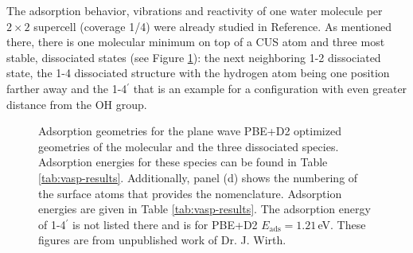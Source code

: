 \documentclass[11pt,DIV=13,BCOR=5mm,a4paper,headinclude]{scrbook}
\begin{document}
The adsorption behavior, vibrations and reactivity of one water  molecule per $2\times 2$ supercell (coverage 1/4) were already studied in Reference\cite{WirthJPCC2012}.
As mentioned there, there is one molecular minimum on top of a CUS atom and three most stable, dissociated states (see Figure \ref{abb:0001_ads}): the next neighboring 1-2 dissociated state, the 1-4 dissociated structure with the hydrogen atom being one position farther away and the 1-4$^\prime$ that is an example for a configuration with even greater distance from the OH group.
\begin{figure} [!ht]
\centering
{}
         \quad
{}
 \quad
{}
 \quad
{}
\caption{Adsorption geometries for the plane wave PBE+D2 optimized geometries of the molecular and the three dissociated species.
Adsorption energies for these species can be found in Table \ref{tab:vasp-results}.
Additionally, panel (d) shows the numbering of the surface atoms that provides the nomenclature.
Adsorption energies are given in Table \ref{tab:vasp-results}.
The adsorption energy of 1-4$^\prime$ is not listed there and is for PBE+D2 $E_\textrm{ads}=1.21\,$eV.
These figures are from unpublished work of Dr. J. Wirth.}
       \label{abb:0001_ads}
\end{figure}
\end{document}

